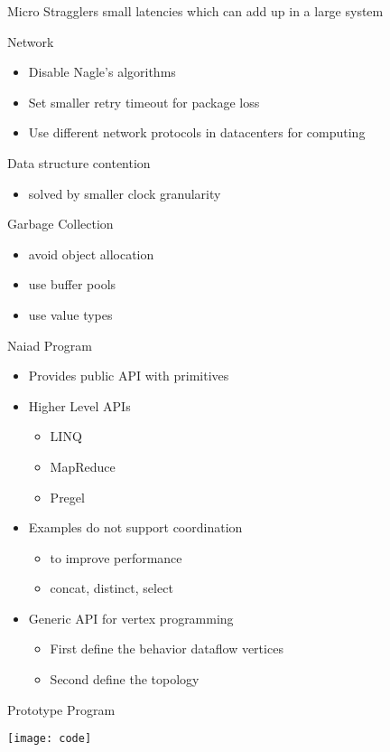  \begin{frame}[t]{Micro Stragglers}
  \vspace{0.15cm}
small latencies which can add up in a large system
  \vspace{0.15cm}
 
Network

\begin{itemize}\setlength\itemsep{0.25cm}
\item Disable Nagle's algorithms
\item Set smaller retry timeout for package loss
\item Use different network protocols in datacenters for computing
\end{itemize}

Data structure contention
\begin{itemize}
\item solved by smaller clock granularity
\end{itemize}

Garbage Collection

\begin{itemize}\setlength\itemsep{0.25cm}
\item avoid object allocation
\item use buffer pools
\item use value types
\end{itemize}

\end{frame}

 \begin{frame}[t]{Naiad Program}
  \vspace{0.15cm}
   \begin{itemize}\setlength\itemsep{0.25cm}
     \item Provides public API with primitives
     \item Higher Level APIs
     \begin{itemize}\setlength\itemsep{0.25cm}
      \item LINQ
      \item MapReduce
      \item Pregel
     \end{itemize}
     \item Examples do not support coordination
     \begin{itemize}\setlength\itemsep{0.25cm}
     \item to improve performance
     \item concat, distinct, select
     \end{itemize}
     \item Generic API for vertex programming
     \begin{itemize}\setlength\itemsep{0.25cm}
     \item First define the behavior dataflow vertices
     \item Second define the topology
     \end{itemize}
   \end{itemize}

\end{frame}

\begin{frame}[t]{Prototype Program}

\begin{center}
  \texttt{[image: code]}
\end{center}

\end{frame}
